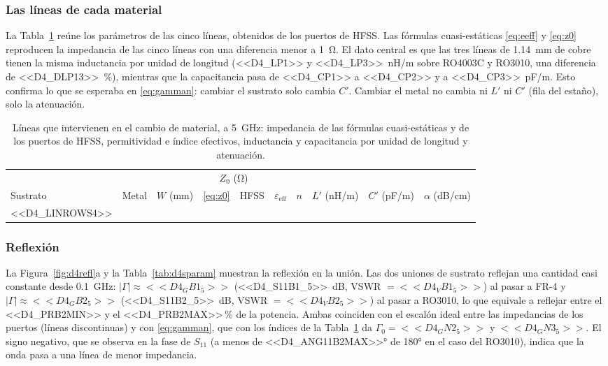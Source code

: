 \documentclass[11pt,letterpaper]{article}
\begin{document}
\subsubsection{Las líneas de cada material}
La Tabla~\ref{tab:d4lineas} reúne los parámetros de las cinco líneas, obtenidos de los puertos de HFSS. Las fórmulas cuasi-estáticas \eqref{eq:eeff} y \eqref{eq:z0} reproducen la impedancia de las cinco líneas con una diferencia menor a \SI{1}{\ohm}. El dato central es que las tres líneas de \SI{1.14}{mm} de cobre tienen la misma inductancia por unidad de longitud (<<D4_LP1>> y <<D4_LP3>>~nH/m sobre RO4003C y RO3010, una diferencia de \SI{<<D4_DLP13>>}{\percent}), mientras que la capacitancia pasa de <<D4_CP1>> a <<D4_CP2>> y a <<D4_CP3>>~pF/m. Esto confirma lo que se esperaba en \eqref{eq:gamman}: cambiar el sustrato solo cambia $C'$. Cambiar el metal no cambia ni $L'$ ni $C'$ (fila del estaño), solo la atenuación.

\begin{table}[htbp]
\centering
\caption{Líneas que intervienen en el cambio de material, a \SI{5}{GHz}: impedancia de las fórmulas cuasi-estáticas y de los puertos de HFSS, permitividad e índice efectivos, inductancia y capacitancia por unidad de longitud y atenuación.}
\label{tab:d4lineas}
\small
\setlength{\tabcolsep}{4pt}
\begin{tabular}{llcccccccc}
\toprule
 & & & \multicolumn{2}{c}{$Z_0$ (\si{\ohm})} & & & & & \\
\cmidrule(lr){4-5}
Sustrato & Metal & $W$ (mm) & \eqref{eq:z0} & HFSS & $\varepsilon_{\mathrm{eff}}$ & $n$ & $L'$ (nH/m) & $C'$ (pF/m) & $\alpha$ (dB/cm) \\
\midrule
<<D4_LINROWS4>>
\bottomrule
\end{tabular}
\end{table}

\subsubsection{Reflexión}
La Figura~\ref{fig:d4refl}a y la Tabla~\ref{tab:d4sparam} muestran la reflexión en la unión. Las dos uniones de sustrato reflejan una cantidad casi constante desde \SI{0.1}{GHz}: $|\Gamma|\approx<<D4_GB1_5>>$ (\SI{<<D4_S11B1_5>>}{dB}, VSWR $=<<D4_VB1_5>>$) al pasar a FR-4 y $|\Gamma|\approx<<D4_GB2_5>>$ (\SI{<<D4_S11B2_5>>}{dB}, VSWR $=<<D4_VB2_5>>$) al pasar a RO3010, lo que equivale a reflejar entre el <<D4_PRB2MIN>> y el <<D4_PRB2MAX>>\,\% de la potencia. Ambas coinciden con el escalón ideal entre las impedancias de los puertos (líneas discontinuas) y con \eqref{eq:gamman}, que con los índices de la Tabla~\ref{tab:d4lineas} da $\Gamma_0=<<D4_GN2_5>>$ y $<<D4_GN3_5>>$. El signo negativo, que se observa en la fase de $S_{11}$ (a menos de \ang{<<D4_ANG11B2MAX>>} de \ang{180} en el caso del RO3010), indica que la onda pasa a una línea de menor impedancia.
\end{document}
